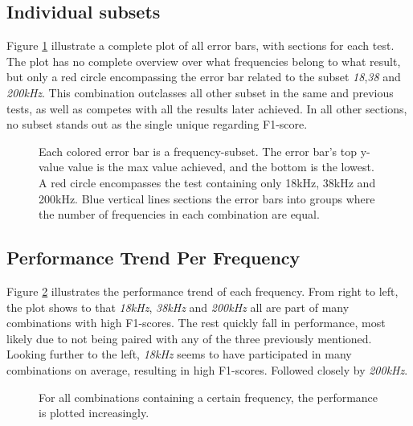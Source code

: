     \subsection{Individual subsets}
        Figure \ref{errorbar_fig} illustrate a complete plot of all error bars, with sections for each test. The plot has no complete overview over what frequencies belong to what result, but only a red circle encompassing the error bar related to the subset \textit{18},\textit{38} and \textit{200kHz}. This combination outclasses all other subset in the same and previous tests, as well as competes with all the results later achieved. In all other sections, no subset stands out as the single unique regarding F1-score.
        
        \begin{figure}[H]
            \centering
            
            \caption[Error bars per combination]{Each colored error bar is a frequency-subset. The error bar's top y-value value is the max value achieved, and the bottom is the lowest. A red circle encompasses the test containing only 18kHz, 38kHz and 200kHz. Blue vertical lines sections the error bars into groups where the number of frequencies in each combination are equal.}
          	\medskip 
            \label{errorbar_fig}
        \end{figure}
        
        
        
    \subsection{Performance Trend Per Frequency} 
        Figure \ref{performance_trend_fig} illustrates the performance trend of each frequency. From right to left, the plot shows to that \textit{18kHz}, \textit{38kHz} and \textit{200kHz} all are part of many combinations with high F1-scores. The rest quickly fall in performance, most likely due to not being paired with any of the three previously mentioned. Looking further to the left, \textit{18kHz} seems to have participated in many combinations on average, resulting in high F1-scores. Followed closely by \textit{200kHz}.
        \begin{figure}[H]
            \centering
            
            \caption[Performance trend per frequency]{For all combinations containing a certain frequency, the performance is plotted increasingly.}
          	\medskip 
            \label{performance_trend_fig}
        \end{figure}
        
        
    

    
    
